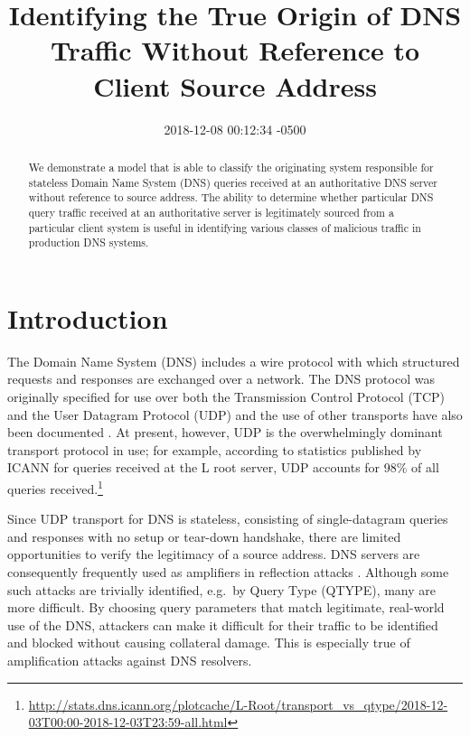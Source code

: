 \documentclass[conference]{IEEEtran}
\title{Identifying the True Origin of DNS Traffic Without Reference to Client
Source Address}
\author{\IEEEauthorblockN{Joe Abley}\IEEEauthorblockA{Western University, London, Ontario, Canada \\ Afilias Canada, Toronto, Ontario, Canada \\ \href{mailto:jabley@uwo.ca}{\nolinkurl{jabley@uwo.ca}},
\href{mailto:jabley@afilias.info}{\nolinkurl{jabley@afilias.info}}}}
\date{2018-12-08 00:12:34 -0500}
\let\citep\cite
\begin{document}
\maketitle
\begin{abstract}
We demonstrate a model that is able to classify the originating system
responsible for stateless Domain Name System (DNS) queries received at
an authoritative DNS server without reference to source address. The
ability to determine whether particular DNS query traffic received at an
authoritative server is legitimately sourced from a particular client
system is useful in identifying various classes of malicious traffic in
production DNS systems.
\end{abstract}

\section{Introduction}\label{sec:introduction}

\label{sec:introduction}

The Domain Name System (DNS) includes a wire protocol with which
structured requests and responses are exchanged over a network. The DNS
protocol was originally specified \citep{rfc1034}\citep{rfc1035} for use
over both the Transmission Control Protocol (TCP) \citep{rfc793} and the
User Datagram Protocol (UDP) \citep{rfc768} and the use of other
transports have also been documented
\citep{rfc7858}\citep{rfc8484}\citep{huitema-quic-dnsoquic-05}. At
present, however, UDP is the overwhelmingly dominant transport protocol
in use; for example, according to statistics published by ICANN for
queries received at the L root server, UDP accounts for 98\% of all
queries
received.\footnote{\url{http://stats.dns.icann.org/plotcache/L-Root/transport_vs_qtype/2018-12-03T00:00-2018-12-03T23:59-all.html}}

Since UDP transport for DNS is stateless, consisting of single-datagram
queries and responses with no setup or tear-down handshake, there are
limited opportunities to verify the legitimacy of a source address. DNS
servers are consequently frequently used as amplifiers in reflection
attacks \citep{rfc5358}. Although some such attacks are trivially
identified, e.g.~by Query Type (QTYPE), many are more difficult. By
choosing query parameters that match legitimate, real-world use of the
DNS, attackers can make it difficult for their traffic to be identified
and blocked without causing collateral damage. This is especially true
of amplification attacks against DNS resolvers.
\end{document}
